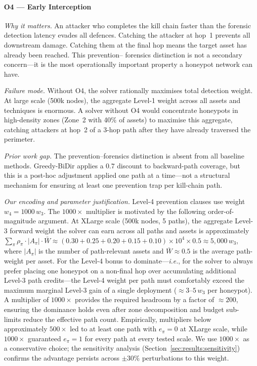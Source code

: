 \documentclass[journal]{IEEEtran}
\newcommand{\ie}{\emph{i.e.}}
\begin{document}
\paragraph{O4 --- Early Interception}
\textit{Why it matters.}
An attacker who completes the kill chain faster than the forensic
detection latency evades all defences. Catching the attacker at
hop~1 prevents all downstream damage. Catching them at the final hop
means the target asset has already been reached. This prevention--
forensics distinction is not a secondary concern---it is the most
operationally important property a honeypot network can have.

\textit{Failure mode.}
Without O4, the solver rationally maximises total detection weight.
At large scale (500k nodes), the aggregate Level-1 weight across
all assets and techniques is enormous. A solver without O4 would
concentrate honeypots in high-density zones (Zone~2 with 40\% of
assets) to maximise this aggregate, catching attackers at hop~2 of
a 3-hop path after they have already traversed the perimeter.

\textit{Prior work gap.}
The prevention--forensics distinction is absent from all baseline
methods. Greedy-BiDir applies a $0.7$ discount to backward-path
coverage, but this is a post-hoc adjustment applied one path at a
time---not a structural mechanism for ensuring at least one prevention
trap per kill-chain path.

\textit{Our encoding and parameter justification.}
Level-4 prevention clauses use weight $w_4=1000\,w_3$. The
$1000\times$ multiplier is motivated by the following order-of-magnitude
argument. At XLarge scale (500k nodes, 5 paths), the aggregate Level-3
forward weight the solver can earn across all paths and assets is
approximately $\sum_\pi \rho_\pi \cdot |A_\pi| \cdot \bar{W} \approx
(0.30{+}0.25{+}0.20{+}0.15{+}0.10) \times 10^4 \times 0.5 \approx
5{,}000\,w_3$, where $|A_\pi|$ is the number of path-relevant assets
and $\bar{W}\approx0.5$ is the average path-weight per asset. For the
Level-4 bonus to dominate---\ie, for the solver to always prefer
placing one honeypot on a non-final hop over accumulating additional
Level-3 path credits---the Level-4 weight per path must comfortably
exceed the maximum marginal Level-3 gain of a single deployment
(${\approx}3$--$5\,w_3$ per honeypot). A multiplier of $1000\times$
provides the required headroom by a factor of ${\approx}200$, ensuring
the dominance holds even after zone decomposition and budget
sub-limits reduce the effective path count. Empirically, multipliers
below approximately $500\times$ led to at least one path with
$e_\pi=0$ at XLarge scale, while $1000\times$ guaranteed $e_\pi=1$
for every path at every tested scale. We use $1000\times$ as a
conservative choice; the sensitivity analysis
(Section~\ref{sec:results:sensitivity}) confirms the advantage
persists across $\pm30\%$ perturbations to this weight.
\end{document}
